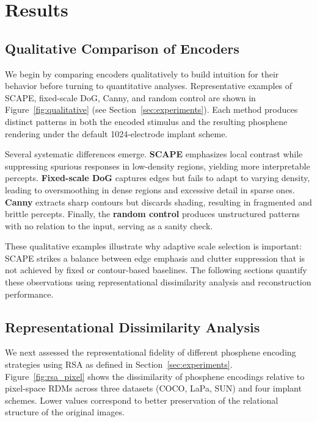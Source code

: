 \section{Results}
\label{sec:results}
\subsection{Qualitative Comparison of Encoders}
\label{sec:qualitative}

We begin by comparing encoders qualitatively to build intuition for their behavior before turning to quantitative analyses. 
Representative examples of SCAPE, fixed-scale DoG, Canny, and random control are shown in Figure~\ref{fig:qualitative} (see Section~\ref{sec:experiments}). 
Each method produces distinct patterns in both the encoded stimulus and the resulting phosphene rendering under the default 1024-electrode implant scheme.

Several systematic differences emerge. 
\textbf{SCAPE} emphasizes local contrast while suppressing spurious responses in low-density regions, yielding more interpretable percepts. 
\textbf{Fixed-scale DoG} captures edges but fails to adapt to varying density, leading to oversmoothing in dense regions and excessive detail in sparse ones. 
\textbf{Canny} extracts sharp contours but discards shading, resulting in fragmented and brittle percepts. 
Finally, the \textbf{random control} produces unstructured patterns with no relation to the input, serving as a sanity check. 

These qualitative examples illustrate why adaptive scale selection is important: SCAPE strikes a balance between edge emphasis and clutter suppression that is not achieved by fixed or contour-based baselines. The following sections quantify these observations using representational dissimilarity analysis and reconstruction performance.

\subsection{Representational Dissimilarity Analysis}
We next assessed the representational fidelity of different phosphene encoding strategies using RSA as defined in Section~\ref{sec:experiments}. 
Figure~\ref{fig:rsa_pixel} shows the dissimilarity of phosphene encodings relative to pixel-space RDMs across three datasets (COCO, LaPa, SUN) and four implant schemes. 
Lower values correspond to better preservation of the relational structure of the original images.

